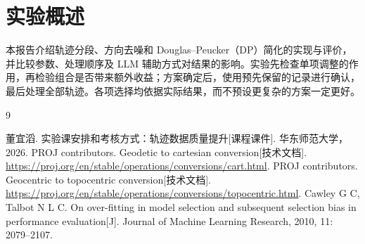 \documentclass[11pt,a4paper]{article}
\newcommand{\nextchapter}{\FloatBarrier\clearpage}
\begin{document}
\section*{实验概述}
本报告介绍轨迹分段、方向去噪和 Douglas--Peucker（DP）简化的实现与评价，并比较参数、处理顺序及 LLM 辅助方式对结果的影响。实验先检查单项调整的作用，再检验组合是否带来额外收益；方案确定后，使用预先保留的记录进行确认，最后处理全部轨迹。各项选择均依据实际结果，而不预设更复杂的方案一定更好。
\vspace{8mm}
\tableofcontents
\clearpage{}

\nextchapter
\nextchapter
\nextchapter
\nextchapter
\nextchapter
\nextchapter
\FloatBarrier
\vspace{6mm}
\begingroup\small
\begin{thebibliography}{9}
 董宜滔. 实验课安排和考核方式：轨迹数据质量提升[课程课件]. 华东师范大学，2026.
 PROJ contributors. Geodetic to cartesian conversion[技术文档]. \url{https://proj.org/en/stable/operations/conversions/cart.html}.
 PROJ contributors. Geocentric to topocentric conversion[技术文档]. \url{https://proj.org/en/stable/operations/conversions/topocentric.html}.
 Cawley G C, Talbot N L C. On over-fitting in model selection and subsequent selection bias in performance evaluation[J]. Journal of Machine Learning Research, 2010, 11: 2079--2107.
\end{thebibliography}\endgroup
\nextchapter\appendix
\end{document}
